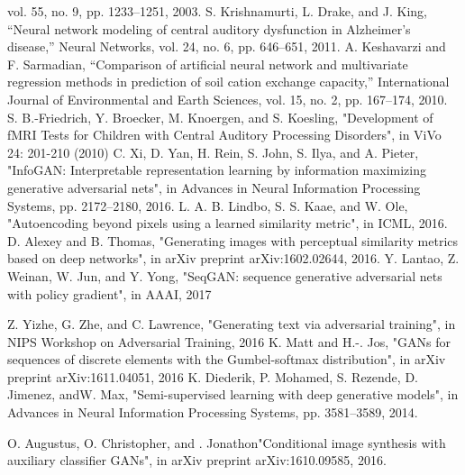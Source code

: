 \documentclass[letterpaper%
, twoside%
, 12pt%
,these%
, english%
,creativecommons,hyperref%
]{thETS}
\begin{document}
\begin{thebibliography}{9}
	vol. 55, no. 9, pp. 1233–1251, 2003.
 S. Krishnamurti, L. Drake, and J. King, “Neural network modeling of central auditory
	dysfunction in Alzheimer’s disease,” Neural Networks, vol. 24, no. 6, pp. 646–651, 2011.
 A. Keshavarzi and F. Sarmadian, “Comparison of artificial neural network and multivariate
	regression methods in prediction of soil cation exchange capacity,” International
	Journal of Environmental and Earth Sciences, vol. 15, no. 2, pp. 167–174, 2010.
 S. B.-Friedrich, Y. Broecker, M. Knoergen, and S. Koesling, "Development of fMRI Tests
	for Children with Central Auditory Processing Disorders", in ViVo 24: 201-210 (2010)
 C. Xi, D. Yan, H. Rein, S. John, S. Ilya, and A. Pieter, "InfoGAN: Interpretable representation
	learning by information maximizing generative adversarial nets", in Advances in
	Neural Information Processing Systems, pp. 2172–2180, 2016.
 L. A. B. Lindbo, S. S. Kaae, and W. Ole, "Autoencoding beyond pixels using a learned
	similarity metric", in ICML, 2016.
 D. Alexey and B. Thomas, "Generating images with perceptual similarity metrics based
	on deep networks", in arXiv preprint arXiv:1602.02644, 2016.
 Y. Lantao, Z. Weinan, W. Jun, and Y. Yong, "SeqGAN: sequence generative adversarial
	nets with policy gradient", in AAAI, 2017

 Z. Yizhe, G. Zhe, and C. Lawrence, "Generating text via adversarial training", in NIPS
	Workshop on Adversarial Training, 2016
 K. Matt and H.-. Jos, "GANs for sequences of discrete elements with the Gumbel-softmax
	distribution", in arXiv preprint arXiv:1611.04051, 2016
 K. Diederik, P. Mohamed, S. Rezende, D. Jimenez, andW. Max, "Semi-supervised learning
	with deep generative models", in Advances in Neural Information Processing Systems,
	pp. 3581–3589, 2014.

 O. Augustus, O. Christopher, and . Jonathon"Conditional image synthesis with auxiliary
	classifier GANs", in arXiv preprint arXiv:1610.09585, 2016.
	\end{thebibliography}
\end{document}

